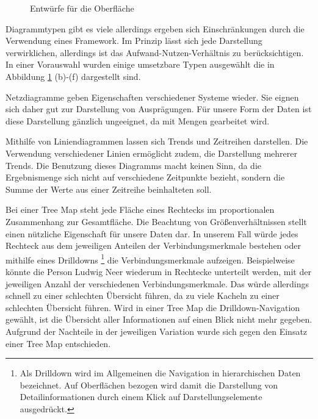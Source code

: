 \begin{figure}[htbp]
\caption{Entwürfe für die Oberfläche}
\label{konzept_darstellung}
\end{figure}

Diagrammtypen gibt es viele allerdings ergeben sich Einschränkungen durch die Verwendung eines Framework. Im Prinzip lässt sich jede Darstellung verwirklichen, allerdings ist das Aufwand-Nutzen-Verhältnis zu berücksichtigen. In einer Vorauswahl wurden einige umsetzbare Typen ausgewählt die in Abbildung \ref{konzept_darstellung} (b)-(f) dargestellt sind. 

Netzdiagramme geben Eigenschaften verschiedener Systeme wieder. Sie eignen sich daher gut zur Darstellung von Ausprägungen. Für unsere Form der Daten ist diese Darstellung gänzlich ungeeignet, da mit Mengen gearbeitet wird. 

Mithilfe von Liniendiagrammen lassen sich Trends und Zeitreihen darstellen. Die Verwendung verschiedener Linien ermöglicht zudem, die Darstellung mehrerer Trends. Die Benutzung dieses Diagramms macht keinen Sinn, da die Ergebnismenge sich nicht auf verschiedene Zeitpunkte bezieht, sondern die Summe der Werte aus einer Zeitreihe beinhalteten soll. 

Bei einer Tree Map steht jede Fläche eines Rechtecks im proportionalen Zusammenhang zur Gesamtfläche. Die Beachtung von Größenverhältnissen stellt einen nützliche Eigenschaft für unsere Daten dar. In unserem Fall würde jedes Rechteck aus dem jeweiligen Anteilen der Verbindungsmerkmale bestehen oder mithilfe eines Drilldowns
\footnote{Als Drilldown wird im Allgemeinen die Navigation in hierarchischen Daten bezeichnet. Auf Oberflächen bezogen wird damit die Darstellung von Detailinformationen durch einem Klick auf Darstellungselemente ausgedrückt. }
 die Verbindungsmerkmale aufzeigen. Beispielweise könnte die Person Ludwig Neer wiederum in Rechtecke unterteilt werden, mit der jeweiligen Anzahl der verschiedenen Verbindungsmerkmale. Das würde allerdings schnell zu einer schlechten Übersicht führen, da zu viele Kacheln zu einer schlechten Übersicht führen. Wird in einer Tree Map die Drilldown-Navigation gewählt, ist die Übersicht aller Informationen auf einen Blick nicht mehr gegeben. Aufgrund der Nachteile in der jeweiligen Variation wurde sich gegen den Einsatz einer Tree Map entschieden.

